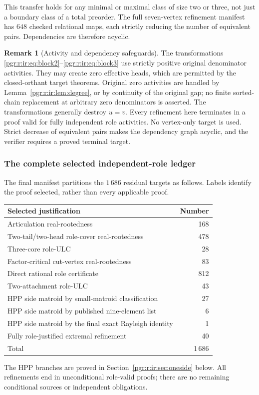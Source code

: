 \documentclass[11pt]{article}
\numberwithin{equation}{section}
\theoremstyle{definition}\newtheorem{definition}[theorem]{Definition}\newtheorem{remark}[theorem]{Remark}
\begin{document}
This transfer holds for any minimal or maximal class of size two or three, not just a boundary class of a total preorder. The full seven-vertex refinement manifest has $648$ checked relational maps, each strictly reducing the number of equivalent pairs. Dependencies are therefore acyclic.

\begin{remark}[Activity and dependency safeguards]\label{pgr:r:ir:rem:scope}
The transformations \eqref{pgr:r:ir:eq:block2}--\eqref{pgr:r:ir:eq:block3} use strictly positive original denominator activities. They may create zero effective heads, which are permitted by the closed-orthant target theorems. Original zero activities are handled by Lemma~\ref{pgr:r:ir:lem:degree}, or by continuity of the original gap; no finite sorted-chain replacement at arbitrary zero denominators is asserted. The transformations generally destroy $u=v$. Every refinement here terminates in a proof valid for fully independent role activities. No vertex-only target is used. Strict decrease of equivalent pairs makes the dependency graph acyclic, and the verifier requires a proved terminal target.
\end{remark}

\subsubsection{The complete selected independent-role ledger}
The final manifest partitions the $1\,686$ residual targets as follows. Labels identify the proof selected, rather than every applicable proof.
\begin{center}
\begin{tabular}{lr}
\toprule Selected justification&Number\\\midrule
Articulation real-rootedness&168\\
Two-tail/two-head role-cover real-rootedness&478\\
Three-core role-ULC&28\\
Factor-critical cut-vertex real-rootedness&83\\
Direct rational role certificate&812\\
Two-attachment role-ULC&43\\
HPP side matroid by small-matroid classification&27\\
HPP side matroid by published nine-element list&6\\
HPP side matroid by the final exact Rayleigh identity&1\\
Fully role-justified extremal refinement&40\\\midrule
Total&1\,686\\\bottomrule
\end{tabular}
\end{center}
The HPP branches are proved in Section~\ref{pgr:r:ir:sec:oneside} below. All refinements end in unconditional role-valid proofs; there are no remaining conditional sources or independent obligations.
\end{document}

